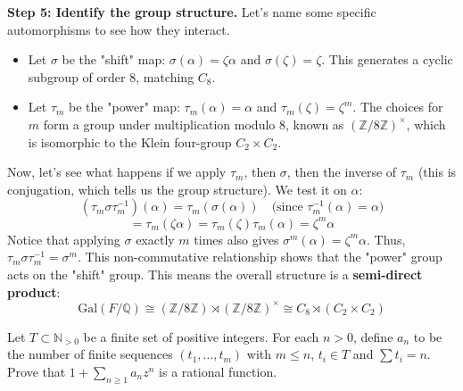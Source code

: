 \begin{solution}
\textbf{Step 5: Identify the group structure.}
Let's name some specific automorphisms to see how they interact.
\begin{itemize}
    \item Let $\sigma$ be the "shift" map: $\sigma(\alpha) = \zeta \alpha$ and $\sigma(\zeta) = \zeta$. This generates a cyclic subgroup of order 8, matching $C_8$.
    \item Let $\tau_m$ be the "power" map: $\tau_m(\alpha) = \alpha$ and $\tau_m(\zeta) = \zeta^m$. The choices for $m$ form a group under multiplication modulo 8, known as $(\mathbb{Z}/8\mathbb{Z})^\times$, which is isomorphic to the Klein four-group $C_2 \times C_2$.
\end{itemize}
Now, let's see what happens if we apply $\tau_m$, then $\sigma$, then the inverse of $\tau_m$ (this is conjugation, which tells us the group structure). We test it on $\alpha$:
\[ (\tau_m \sigma \tau_m^{-1})(\alpha) = \tau_m (\sigma(\alpha)) \quad \text{(since } \tau_m^{-1}(\alpha) = \alpha\text{)} \]
\[ = \tau_m (\zeta \alpha) = \tau_m(\zeta) \tau_m(\alpha) = \zeta^m \alpha \]
Notice that applying $\sigma$ exactly $m$ times also gives $\sigma^m(\alpha) = \zeta^m \alpha$.
Thus, $\tau_m \sigma \tau_m^{-1} = \sigma^m$.
This non-commutative relationship shows that the "power" group acts on the "shift" group. This means the overall structure is a \textbf{semi-direct product}:
\[ \mathrm{Gal}(F/\mathbb{Q}) \cong (\mathbb{Z}/8\mathbb{Z}) \rtimes (\mathbb{Z}/8\mathbb{Z})^\times \cong C_8 \rtimes (C_2 \times C_2) \]
\end{solution}

\begin{exercise}
\label{algebra:2010:5}
Let $T \subset \mathbb{N}_{>0}$ be a finite set of positive integers. For each $n > 0$, define $a_n$ to be the number of finite sequences $(t_1, \ldots, t_m)$ with $m \leq n$, $t_i \in T$ and $\sum t_i = n$. Prove that $1 + \sum_{n \geq 1} a_n z^n$ is a rational function.
\end{exercise}

